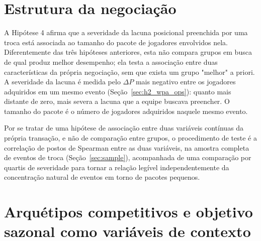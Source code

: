 \section{Estrutura da negociação}
\label{sec:h4_structure}

A Hipótese 4 afirma que a severidade da lacuna posicional preenchida por uma troca está associada ao tamanho do pacote de jogadores envolvidos nela. Diferentemente das três hipóteses anteriores, esta não compara grupos em busca de qual produz melhor desempenho; ela testa a associação entre duas características da própria negociação, sem que exista um grupo "melhor" a priori. A severidade da lacuna é medida pelo $\Delta P$ mais negativo entre os jogadores adquiridos em um mesmo evento (Seção~\ref{sec:h2_wpa_ops}): quanto mais distante de zero, mais severa a lacuna que a equipe buscava preencher. O tamanho do pacote é o número de jogadores adquiridos naquele mesmo evento.

Por se tratar de uma hipótese de associação entre duas variáveis contínuas da própria transação, e não de comparação entre grupos, o procedimento de teste é a correlação de postos de Spearman entre as duas variáveis, na amostra completa de eventos de troca (Seção~\ref{sec:sample}), acompanhada de uma comparação por quartis de severidade para tornar a relação legível independentemente da concentração natural de eventos em torno de pacotes pequenos.

\section{Arquétipos competitivos e objetivo sazonal como variáveis de contexto}
\label{sec:archetype_moderation}

